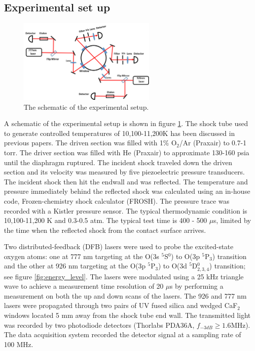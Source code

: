 \documentclass[12pt]{iopart}
\begin{document}
\subsection{Experimental set up}
\begin{figure}[h]
  \centering
     \includegraphics[width=0.6\textwidth]{schematic.png}
    \caption{\label{fig:schematic}  The schematic of the experimental setup. 
    }
\end{figure}
A schematic of the experimental setup is shown in figure \ref{fig:schematic}. The shock tube used to generate controlled temperatures of 10,100-11,200K has been discussed in previous papers\cite{Li2019_modeling,nations2015_new}. The driven section was filled with 1\% O$_2$/Ar (Praxair) to 0.7-1 torr. The driver section was filled with He (Praxair) to approximate 130-160 psia until the diaphragm ruptured. The incident shock traveled down the driven section and its velocity was measured by five piezoelectric pressure transducers. The incident shock then hit the endwall and was reflected. The temperature and pressure immediately behind the reflected shock was calculated using an in-house code, Frozen-chemistry shock calculator (FROSH). The pressure trace was recorded with a Kistler pressure sensor. The typical thermodynamic condition is 10,100-11,200 K and 0.3-0.5 atm. The typical test time is 400 - 500 $\mu$s, limited by the time when the reflected shock from the contact surface arrives.

Two distributed-feedback (DFB) lasers were used to probe the excited-state oxygen atoms: one at 777 nm targeting at the O(3s $^5$S$^0$) to O(3p $^5$P$_{3}$) transition  and the other at 926 nm targeting at the O(3p $^5$P$_{3}$) to O(3d $^5$D$_{2,3,4}^0$) transition; see figure \ref{fig:energy_level}. The lasers were modulated using a 25 kHz triangle wave to achieve a measurement time resolution of 20 $\mu$s by performing a measurement on both the up and down scans of the lasers. The 926 and 777 nm lasers were propagated through two pairs of UV fused silica and wedged CaF$_2$ windows located 5 mm away from the shock tube end wall. The transmitted light was recorded by two photodiode detectors (Thorlabs PDA36A, $f_{-3dB} \ge 1.6$MHz). The data acquisition system recorded the detector signal at a sampling rate of 100 MHz.
\end{document}
